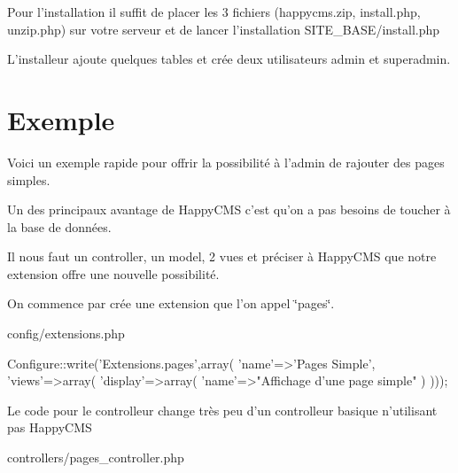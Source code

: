 \-Pour l'installation il suffit de placer les 3 fichiers (happycms.\-zip, install.\-php, unzip.\-php) sur votre serveur et de lancer l'installation \-S\-I\-T\-E\-\_\-\-B\-A\-S\-E/install.\-php \par
\par
 \-L'installeur ajoute quelques tables et crée deux utilisateurs admin et superadmin.\hypertarget{index_example_sec}{}\section{\-Exemple}\label{index_example_sec}
\-Voici un exemple rapide pour offrir la possibilité à l'admin de rajouter des pages simples. \par
\-Un des principaux avantage de \-Happy\-C\-M\-S c'est qu'on a pas besoins de toucher à la base de données. \par
 \par
 \-Il nous faut un controller, un model, 2 vues et préciser à \-Happy\-C\-M\-S que notre extension offre une nouvelle possibilité. \par
\par
 \-On commence par crée une extension que l'on appel \char`\"{}pages\char`\"{}.\par
 config/extensions.\-php 
\begin{DoxyCode}
 Configure::write('Extensions.pages',array(
                                           'name'=>'Pages Simple',
                                           'views'=>array(
                                              'display'=>array(
                                                  'name'=>"Affichage d'une page
       simple"
                                                  )
                                          )));
\end{DoxyCode}
 \par
 \-Le code pour le controlleur change très peu d'un controlleur basique n'utilisant pas \-Happy\-C\-M\-S \par
\par
controllers/pages\-\_\-controller.\-php 
